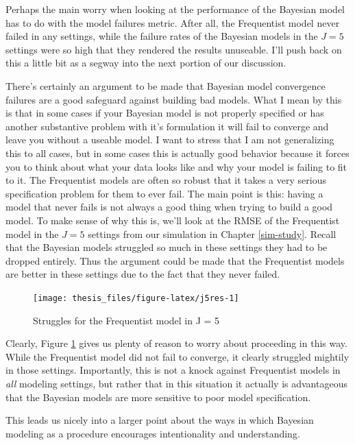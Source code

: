 \documentclass[12pt,twoside]{reedthesis}
\begin{document}
Perhaps the main worry when looking at the performance of the Bayesian model has to do with the model failures metric. After all, the Frequentist model never failed in any settings, while the failure rates of the Bayesian models in the \(J=5\) settings were so high that they rendered the results unuseable. I'll push back on this a little bit as a segway into the next portion of our discussion.

There's certainly an argument to be made that Bayesian model convergence failures are a good safeguard against building bad models. What I mean by this is that in some cases if your Bayesian model is not properly specified or has another substantive problem with it's formulation it will fail to converge and leave you without a useable model. I want to stress that I am not generalizing this to all cases, but in some cases this is actually good behavior because it forces you to think about what your data looks like and why your model is failing to fit to it. The Frequentist models are often so robust that it takes a very serious specification problem for them to ever fail. The main point is this: having a model that never fails is not always a good thing when trying to build a good model. To make sense of why this is, we'll look at the RMSE of the Frequentist model in the \(J = 5\) settings from our simulation in Chapter \ref{sim-study}. Recall that the Bayesian models struggled so much in these settings they had to be dropped entirely. Thus the argument could be made that the Frequentist models are better in these settings due to the fact that they never failed.
\begin{figure}

{\centering \texttt{[image: thesis\_files/figure-latex/j5res-1]} 

}

\caption{Struggles for the Frequentist model in J = 5}\label{fig:j5res}
\end{figure}
Clearly, Figure \ref{fig:j5res} gives us plenty of reason to worry about proceeding in this way. While the Frequentist model did not fail to converge, it clearly struggled mightily in those settings. Importantly, this is not a knock against Frequentist models in \emph{all} modeling settings, but rather that in this situation it actually is advantageous that the Bayesian models are more sensitive to poor model specification.

This leads us nicely into a larger point about the ways in which Bayesian modeling as a procedure encourages intentionality and understanding.
\end{document}
